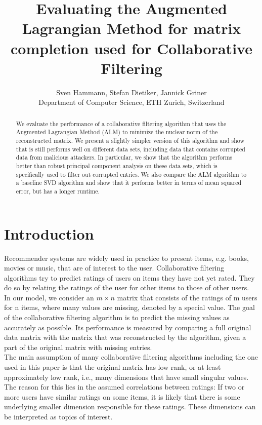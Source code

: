 \documentclass[10pt,conference,compsocconf]{IEEEtran}
\begin{document}
\title{Evaluating the Augmented Lagrangian Method for matrix completion used for Collaborative Filtering}

\author{
  Sven Hammann, Stefan Dietiker, Jannick Griner\\
  Department of Computer Science, ETH Zurich, Switzerland
}

\maketitle

\begin{abstract}
We evaluate the performance of a collaborative filtering algorithm that uses the
Augmented Lagrangian Method (ALM) to minimize the nuclear norm of the reconstructed matrix.
We present a slightly simpler version of this algorithm and show that is still performs
well on different data sets, including data that contains corrupted data from malicious attackers.
In particular, we show that the algorithm performs better than robust principal component analysis
on these data sets, which is specifically used to filter out corrupted entries. We also compare the
ALM algorithm to a baseline SVD algorithm and show that it performs better in terms of mean squared
error, but has a longer runtime.
\end{abstract}

\section{Introduction}
Recommender systems are widely used in practice to present items, e.g. books, movies or music,
that are of interest to the user. Collaborative filtering algorithms try to predict ratings of
users on items they have not yet rated. They do so by relating the ratings of the user for other
items to those of other users. \\

In our model, we consider an $m \times n$ matrix that consists of the ratings of m users for n items,
where many values are missing, denoted by a special value. The goal of the collaborative filtering
algorithm is to predict the missing values as accurately as possible. Its performance is measured
by comparing a full original data matrix with the matrix that was reconstructed by the algorithm,
given a part of the original matrix with missing entries. \\

The main assumption of many collaborative filtering algorithms including the one used in this paper
is that the original matrix has low rank, or at least approximately low rank, i.e., many dimensions
that have small singular values. The reason for this lies in the assumed correlations between ratings:
If two or more users have similar ratings on some items, it is likely that there is some underlying smaller
dimension responsible for these ratings. These dimensions can be interpreted as topics of interest. \\
\end{document}
